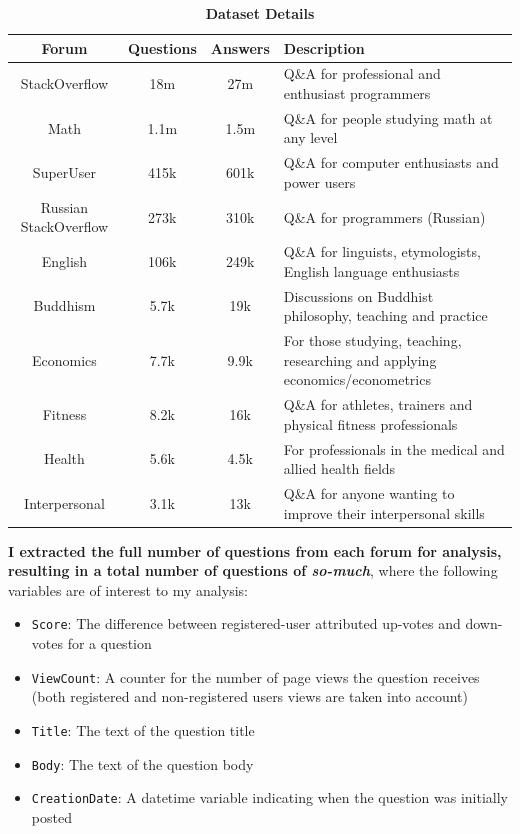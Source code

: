 \documentclass[11pt,preprint, authoryear]{article}
\numberwithin{equation}{section}
\begin{document}
\begin{longtable} {@{} cccp{9cm} @{}}
\caption{\textbf{Dataset Details}}
\label{tab:fora}\\ 
\toprule
Forum & Questions & Answers & Description \\ 
\midrule
StackOverflow & 18m & 27m & Q\&A for professional and enthusiast programmers \\
Math & 1.1m & 1.5m & Q\&A for people studying math at any level \\
SuperUser & 415k & 601k & Q\&A for computer enthusiasts and power users \\ 
Russian StackOverflow & 273k & 310k & Q\&A for programmers (Russian) \\ 
English & 106k & 249k & Q\&A for linguists, etymologists, English language enthusiasts \\ 
Buddhism & 5.7k & 19k & Discussions on Buddhist philosophy, teaching and practice \\
Economics & 7.7k & 9.9k & For those studying, teaching, researching and applying economics/econometrics \\
Fitness & 8.2k & 16k & Q\&A for athletes, trainers and physical fitness professionals \\ 
Health & 5.6k & 4.5k & For professionals in the medical and allied health fields \\ 
Interpersonal & 3.1k & 13k & Q\&A for anyone wanting to improve their interpersonal skills \\ 
\bottomrule
\end{longtable}

\normalsize

\textbf{I extracted the full number of questions from each forum for
analysis, resulting in a total number of questions of \emph{so-much}},
where the following variables are of interest to my analysis:


\begin{itemize}
\item
  \texttt{Score}: The difference between registered-user attributed
  up-votes and down-votes for a question
\item
  \texttt{ViewCount}: A counter for the number of page views the
  question receives (both registered and non-registered users views are
  taken into account)
\item
  \texttt{Title}: The text of the question title
\item
  \texttt{Body}: The text of the question body
\item
  \texttt{CreationDate}: A datetime variable indicating when the
  question was initially posted
\end{itemize}
\end{document}
